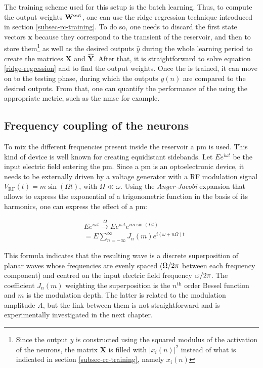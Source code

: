 The training scheme used for this setup is the batch learning. Thus, to compute the output weights $\mathbf{W}^{\text{out}}$, one can use the ridge regression technique introduced in section \ref{subsec-rc-training}. To do so, one needs to discard the first state vectors $\mathbf{x}$ because they correspond to the transient of the reservoir, and then to store them\footnote{Since the output $y$ is constructed using the squared modulus of the activation of the neurons, the matrix $\mathbf{X}$ is filled with $|x_i(n)|^2$ instead of what is indicated in section \ref{subsec-rc-training}, namely $x_i(n)$} as well as the desired outputs $\hat{y}$ during the whole learning period to create the matrices $\mathbf{X}$ and $\hat{\mathbf{Y}}$. After that, it is straightforward to solve equation \eqref{ridge-regression} and to find the output weights. Once the \rcer is trained, it can move on to the testing phase, during which the outputs $y(n)$ are compared to the desired outputs. From that, one can quantify the performance of the \rcer using the appropriate metric, such as the \gls{nmse} for example.


\subsection{Frequency coupling of the neurons}

\label{subsec-freq-coupling}

To mix the different frequencies present inside the reservoir a \gls{pm} is used. This kind of device is well known for creating equidistant sidebands. Let $Ee^{i\omega t}$ be the input electric field entering the \gls{pm}. Since a \gls{pm} is an optoelectronic device, it needs to be externally driven by a voltage generator with a RF modulation signal $V_{\text{RF}}(t) = m \sin{(\Omega t)}$, with $\Omega \ll \omega$. Using the \textit{Anger-Jacobi} expansion that allows to express the exponential of a trigonometric function in the basis of its harmonics, one can express the effect of a \gls{pm}:

\begin{align}
	&Ee^{i\omega t} \overset{\Omega}{\longrightarrow} Ee^{i\omega t}e^{im\sin{(\Omega t)}} \nonumber \\
	& = E \sum_{n=-\infty}^{\infty} J_n(m) e^{i(\omega+n\Omega)t} \label{tf-pm}
\end{align}

This formula indicates that the resulting wave is a discrete superposition of planar waves whose frequencies are evenly spaced ($\Omega/2\pi$ between each frequency component) and centred on the input electric field frequency $\omega/2\pi$. The coefficient $J_n(m)$ weighting the superposition is the $n^{\text{th}}$ order Bessel function and $m$ is the modulation depth. The latter is related to the modulation amplitude $A$, but the link between them is not straightforward and is experimentally investigated in the next chapter. \\

